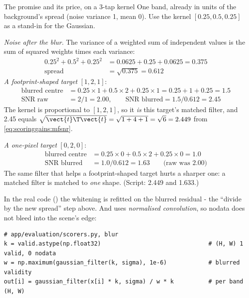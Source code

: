 \begin{worked}[label={we:scoringgains:tap}]{The promise and its price, on a 3-tap kernel}
One band, already in units of the background's spread (noise variance 1, mean 0). Use the kernel $[0.25, 0.5, 0.25]$ as a
stand-in for the Gaussian.

\emph{Noise after the blur.} The variance of a weighted sum of independent values is the sum of squared weights times each
variance:
\begin{align*}
0.25^2 + 0.5^2 + 0.25^2 &= 0.0625 + 0.25 + 0.0625 = 0.375\\
\text{spread} &= \sqrt{0.375} = 0.612
\end{align*}
\emph{A footprint-shaped target} $[1, 2, 1]$:
\begin{align*}
\text{blurred centre} &= 0.25 \times 1 + 0.5 \times 2 + 0.25 \times 1 = 0.25 + 1 + 0.25 = 1.5\\
\text{SNR raw} &= 2 / 1 = 2.00, \qquad \text{SNR blurred} = 1.5 / 0.612 = 2.45
\end{align*}
The kernel is proportional to $[1, 2, 1]$, so it \emph{is} this target's matched filter, and 2.45 equals
$\sqrt{\vect{t}\T\vect{t}} = \sqrt{1 + 4 + 1} = \sqrt{6} = 2.449$ from \eqref{eq:scoringgains:mfsnr}.

\emph{A one-pixel target} $[0, 2, 0]$:
\begin{align*}
\text{blurred centre} &= 0.25 \times 0 + 0.5 \times 2 + 0.25 \times 0 = 1.0\\
\text{SNR blurred} &= 1.0 / 0.612 = 1.63 \qquad\text{(raw was 2.00)}
\end{align*}
The same filter that helps a footprint-shaped target hurts a sharper one: a matched filter is matched to \emph{one} shape.
(Script: 2.449 and 1.633\tagC.)
\end{worked}

In the real code () the whitening is refitted on the blurred residual - the ``divide by the new
spread'' step above. And  uses \emph{normalised convolution}, so nodata does not bleed into the scene's edge:

\begin{lstlisting}
# app/evaluation/scorers.py, blur
k = valid.astype(np.float32)                               # (H, W) 1 valid, 0 nodata
w = np.maximum(gaussian_filter(k, sigma), 1e-6)            # blurred validity
out[i] = gaussian_filter(x[i] * k, sigma) / w * k          # per band (H, W)
\end{lstlisting}

